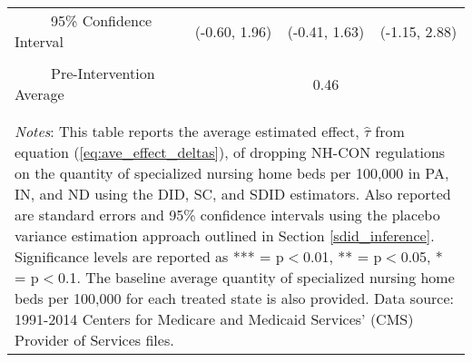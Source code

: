 \documentclass[../Main.tex]{subfiles}
\begin{document}
\begin{table}[htbp]
\begin{tabular}{l*{3}{c}}
\\[-2ex]
\multicolumn{1}{l}{\ \ \ \ \ 95\% Confidence Interval}&   \multicolumn{1}{c}{(-0.60, 1.96)}&   \multicolumn{1}{c}{(-0.41, 1.63)}&   \multicolumn{1}{c}{(-1.15, 2.88)}\\
\\[-2ex]
\multicolumn{1}{l}{\ \ \ \ \ Pre-Intervention Average}&   \multicolumn{3}{c}{0.46}\\
\\[-.1ex]
\hline\hline
\\[-2ex]
\multicolumn{4}{p{.75\linewidth}}{\footnotesize \textit{Notes}: This table reports the average estimated effect, $\hat{\tau}$ from equation (\ref{eq:ave_effect_deltas}), of dropping NH-CON regulations on the quantity of specialized nursing home beds per 100,000 in PA, IN, and ND using the DID, SC, and SDID estimators. Also reported are standard errors and 95\% confidence intervals using the placebo variance estimation approach outlined in Section \ref{sdid_inference}. Significance levels are reported as *** = p$<$0.01, ** = p$<$0.05, * = p$<$0.1. The baseline average quantity of specialized nursing home beds per 100,000 for each treated state is also provided. Data source: 1991-2014 Centers for Medicare and Medicaid Services’ (CMS) Provider of Services files.}
\end{tabular}
\end{table}
\vfill
\clearpage
\end{document}

